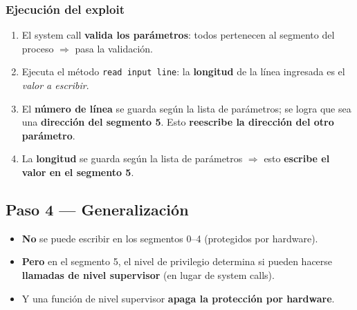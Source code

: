 \documentclass[11pt,a4paper]{article}
\begin{document}
\subsubsection*{Ejecución del exploit}
\begin{enumerate}[leftmargin=1.8em,itemsep=2pt]
  \item El system call \textbf{valida los parámetros}: todos pertenecen al segmento del
        proceso $\Rightarrow$ pasa la validación.
  \item Ejecuta el método \texttt{read input line}: la \textbf{longitud} de la línea ingresada
        es el \emph{valor a escribir}.
  \item El \textbf{número de línea} se guarda según la lista de parámetros; se logra que sea
        una \textbf{dirección del segmento 5}. Esto \textbf{reescribe la dirección del otro
        parámetro}.
  \item La \textbf{longitud} se guarda según la lista de parámetros $\Rightarrow$ esto
        \textbf{escribe el valor en el segmento 5}.
\end{enumerate}

\begin{center}
\end{center}

\subsection{Paso 4 — Generalización}

\begin{itemize}[leftmargin=1.6em,itemsep=2pt]
  \item \textbf{No} se puede escribir en los segmentos 0--4 (protegidos por hardware).
  \item \textbf{Pero} en el segmento 5, el nivel de privilegio determina si pueden hacerse
        \textbf{llamadas de nivel supervisor} (en lugar de system calls).
  \item Y una función de nivel supervisor \textbf{apaga la protección por hardware}.
\end{itemize}
\end{document}

